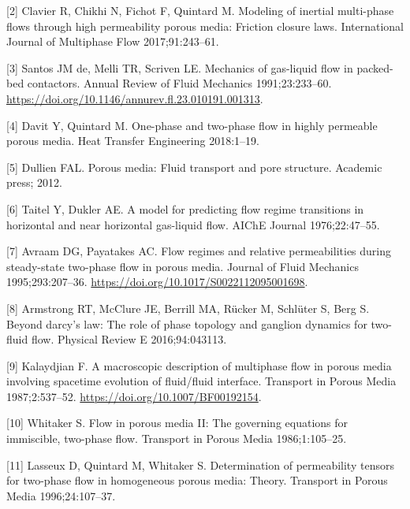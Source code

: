 \documentclass[]{article}
\begin{document}
\leavevmode\hypertarget{ref-clavier2017modeling}{}%
{[}2{]} Clavier R, Chikhi N, Fichot F, Quintard M. Modeling of inertial
multi-phase flows through high permeability porous media: Friction
closure laws. International Journal of Multiphase Flow 2017;91:243--61.

\leavevmode\hypertarget{ref-Santos1991}{}%
{[}3{]} Santos JM de, Melli TR, Scriven LE. Mechanics of gas-liquid flow
in packed-bed contactors. Annual Review of Fluid Mechanics
1991;23:233--60.
\url{https://doi.org/10.1146/annurev.fl.23.010191.001313}.

\leavevmode\hypertarget{ref-davit2018one}{}%
{[}4{]} Davit Y, Quintard M. One-phase and two-phase flow in highly
permeable porous media. Heat Transfer Engineering 2018:1--19.

\leavevmode\hypertarget{ref-dullien2012porous}{}%
{[}5{]} Dullien FAL. Porous media: Fluid transport and pore structure.
Academic press; 2012.

\leavevmode\hypertarget{ref-taitel1976model}{}%
{[}6{]} Taitel Y, Dukler AE. A model for predicting flow regime
transitions in horizontal and near horizontal gas-liquid flow. AIChE
Journal 1976;22:47--55.

\leavevmode\hypertarget{ref-Avraam1995a}{}%
{[}7{]} Avraam DG, Payatakes AC. Flow regimes and relative
permeabilities during steady-state two-phase flow in porous media.
Journal of Fluid Mechanics 1995;293:207--36.
\url{https://doi.org/10.1017/S0022112095001698}.

\leavevmode\hypertarget{ref-armstrong2016beyond}{}%
{[}8{]} Armstrong RT, McClure JE, Berrill MA, Rücker M, Schlüter S, Berg
S. Beyond darcy's law: The role of phase topology and ganglion dynamics
for two-fluid flow. Physical Review E 2016;94:043113.

\leavevmode\hypertarget{ref-Kalaydjian1987}{}%
{[}9{]} Kalaydjian F. A macroscopic description of multiphase flow in
porous media involving spacetime evolution of fluid/fluid interface.
Transport in Porous Media 1987;2:537--52.
\url{https://doi.org/10.1007/BF00192154}.

\leavevmode\hypertarget{ref-Whitaker1986a}{}%
{[}10{]} Whitaker S. Flow in porous media II: The governing equations
for immiscible, two-phase flow. Transport in Porous Media
1986;1:105--25.

\leavevmode\hypertarget{ref-Lasseux1996}{}%
{[}11{]} Lasseux D, Quintard M, Whitaker S. Determination of
permeability tensors for two-phase flow in homogeneous porous media:
Theory. Transport in Porous Media 1996;24:107--37.
\end{document}
